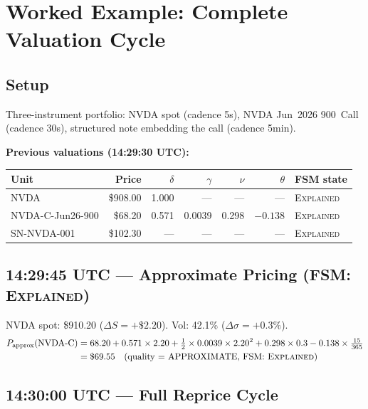 \documentclass[11pt,a4paper]{article}
\begin{document}
\clearpage
\section{Worked Example: Complete Valuation Cycle}
\label{sec:worked-example}

\subsection{Setup}

Three-instrument portfolio: NVDA spot (cadence 5s), NVDA Jun~2026 900~Call (cadence 30s), structured note embedding the call (cadence 5min).

\noindent\textbf{Previous valuations (14:29:30 UTC):}
\begin{center}
\small
\begin{tabular}{l r r r r r l}
\toprule
\textbf{Unit} & \textbf{Price} & \textbf{$\delta$} & \textbf{$\gamma$} & \textbf{$\nu$} & \textbf{$\theta$} & \textbf{FSM state} \\
\midrule
NVDA & \$908.00 & 1.000 & --- & --- & --- & \textsc{Explained} \\
NVDA-C-Jun26-900 & \$68.20 & 0.571 & 0.0039 & 0.298 & $-0.138$ & \textsc{Explained} \\
SN-NVDA-001 & \$102.30 & --- & --- & --- & --- & \textsc{Explained} \\
\bottomrule
\end{tabular}
\end{center}

\subsection{14:29:45 UTC --- Approximate Pricing (FSM: \textsc{Explained})}

NVDA spot: \$910.20 ($\Delta S = +\$2.20$).  Vol: 42.1\% ($\Delta\sigma = +0.3\%$).
\begin{align*}
P_{\mathrm{approx}}(\text{NVDA-C}) &= 68.20 + 0.571 \times 2.20 + \tfrac{1}{2} \times 0.0039 \times 2.20^2 + 0.298 \times 0.3 - 0.138 \times \tfrac{15}{365} \\
&= \$69.55 \quad\text{(quality = APPROXIMATE, FSM: \textsc{Explained})}
\end{align*}

\subsection{14:30:00 UTC --- Full Reprice Cycle}
\end{document}

